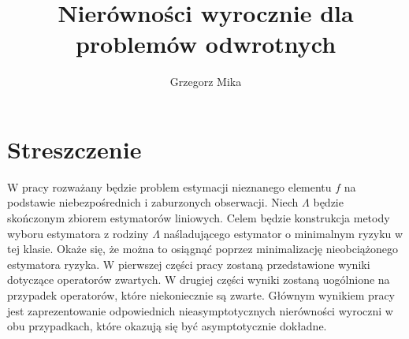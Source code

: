 \documentclass{article}
\title{Nierówności wyrocznie dla problemów odwrotnych}
\author{Grzegorz Mika}
\begin{document}
\maketitle
\section{Streszczenie}
W pracy rozważany będzie problem estymacji nieznanego elementu $f$ na podstawie niebezpośrednich i zaburzonych obserwacji. Niech $\Lambda$ będzie skończonym zbiorem estymatorów liniowych. Celem będzie konstrukcja metody wyboru estymatora z rodziny $\Lambda$ naśladującego estymator o minimalnym ryzyku w tej klasie. Okaże się, że można to osiągnąć poprzez minimalizację nieobciążonego estymatora ryzyka. W pierwszej części pracy zostaną przedstawione wyniki dotyczące operatorów zwartych. W drugiej części wyniki zostaną uogólnione na przypadek operatorów, które niekoniecznie są zwarte. Głównym wynikiem pracy jest zaprezentowanie odpowiednich nieasymptotycznych nierówności wyroczni w obu przypadkach, które okazują się być asymptotycznie dokładne.
\tableofcontents
\end{document}
